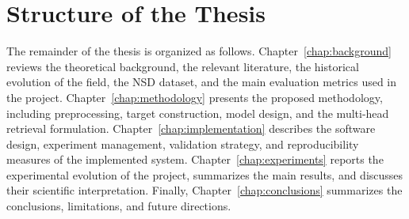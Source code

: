 \section{Structure of the Thesis}

The remainder of the thesis is organized as follows. Chapter~\ref{chap:background} reviews the theoretical background, the relevant literature, the historical evolution of the field, the NSD dataset, and the main evaluation metrics used in the project. Chapter~\ref{chap:methodology} presents the proposed methodology, including preprocessing, target construction, model design, and the multi-head retrieval formulation. Chapter~\ref{chap:implementation} describes the software design, experiment management, validation strategy, and reproducibility measures of the implemented system. Chapter~\ref{chap:experiments} reports the experimental evolution of the project, summarizes the main results, and discusses their scientific interpretation. Finally, Chapter~\ref{chap:conclusions} summarizes the conclusions, limitations, and future directions.
